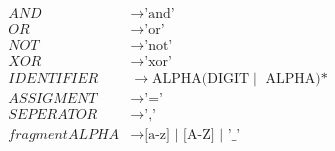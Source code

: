 \begin{align*}
    AND                     & \to \text{'and'}                                                                      \\
    OR                      & \to \text{'or'}                                                                       \\
    NOT                     & \to \text{'not'}                                                                      \\
    XOR                     & \to \text{'xor'}                                                                      \\
    IDENTIFIER              & \to \text{ALPHA(DIGIT} \mid \text{ ALPHA)*}                                           \\
    ASSIGMENT               & \to \text{'='}                                                                        \\
    SEPERATOR               & \to \text{','}                                                                        \\
    fragment ALPHA          & \to \text{[a-z] | [A-Z] | '\_'}
\end{align*}